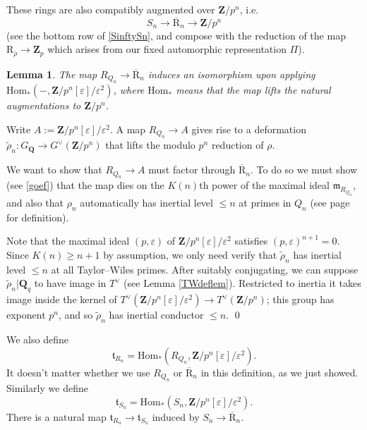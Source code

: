 \documentclass[10pt]{amsart}
\newcommand{\Z}{\mathbf{Z}}
\newcommand{\usbR}{\overline{\mathrm{R}}}
\newcommand{\defring}{\mathrm{R}_{\rhobar}}
\newcommand{\Hom}{\mathrm{Hom}}
\newcommand{\rhobar}{\overline{\rho}}
\newcommand{\Q}{\mathbf{Q}}
\newtheorem{lemma}[subsection]{Lemma}
\theoremstyle{remark}
\begin{document}
 These rings are also compatibly  augmented over $\Z/p^n$, i.e.
$$S_ n  \longrightarrow   \usbR_n \longrightarrow \Z/p^n$$
(see the bottom row of  \eqref{SinftySn}, and compose with the reduction of the map $\defring \rightarrow \Z_p$
which arises from our fixed automorphic representation $\Pi$). 

  
 


\begin{lemma}
The map  $R_{Q_n} \rightarrow \usbR_n$ 
induces an isomorphism  upon applying $\Hom_*(-, \Z/p^n[\varepsilon]/\varepsilon^2)$, 
where $\Hom_*$ means that the map lifts the natural augmentations to $\Z/p^n$. 
\end{lemma}
\proof
Write $A :=   \Z/p^n[\varepsilon]/\varepsilon^2$. 
A map $R_{Q_n} \rightarrow  A$ gives rise to a deformation 
 $\widetilde{\rho}_n: G_{\Q} \rightarrow G^{\vee}(\Z/p^n)$
 that lifts the modulo $p^n$ reduction of $\rho$.   %
%

We want to show that $R_{Q_n} \rightarrow A$ must factor through  $\usbR_n$. 
To do so we must show (see \eqref{goef})  that
the map dies on the $K(n)$th power of the maximal ideal $\mathfrak{m}_{R_{Q_n}}$,
and also that $\rho_n$ automatically has inertial level $\leq n$ at primes in $Q_n$ (see page \pageref{inertial level} for definition). 

Note that the maximal ideal $(p, \varepsilon)$ of $\Z/p^n[\varepsilon]/\varepsilon^2$
satisfies $(p, \varepsilon)^{n+1} = 0$. Since $K(n)  \geq n+1$ by assumption,  we only need verify that $\widetilde{\rho}_n$ has inertial level $\leq n$
at all Taylor--Wiles primes. 
After suitably conjugating, we can suppose $\widetilde{\rho}_n|\Q_q$
to have image in $T^{\vee}$ (see Lemma \ref{TWdeflem}).  Restricted to inertia it takes image inside 
 the kernel of $T^{\vee}(\Z/p^n[\varepsilon]/\varepsilon^2) \rightarrow T^{\vee}(\Z/p^n)$; 
 this group has exponent $p^n$, and  so $\widetilde{\rho}_n$ has inertial conductor $\leq n$. 
\qed 






We also define $$\mathfrak{t}_{R_n} = \Hom_*(R_{Q_n}, \Z/p^n[\varepsilon]/\varepsilon^2).$$ 
      It doesn't matter whether we use $R_{Q_n}$ or $\usbR_n$ in this definition, as we just showed.
  Similarly we define $$\mathfrak{t}_{S_n} = \Hom_*(S_n, \Z/p^n[\varepsilon]/\varepsilon^2).$$  There is a natural map $\mathfrak{t}_{R_n} \rightarrow \mathfrak{t}_{S_n}$
  induced by $S_n \rightarrow \usbR_n$.   
\end{document}
